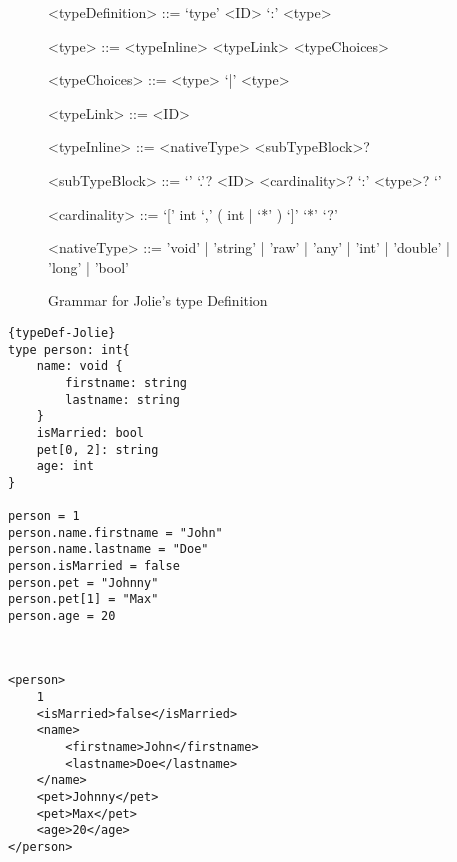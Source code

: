 \begin{figure}
	\begin{framed}
		\begin{grammar}
			<typeDefinition> ::= `type' <ID> `:' <type>

			<type> ::= <typeInline>
			\alt <typeLink>
			\alt <typeChoices>

			<typeChoices> ::= <type> `|' <type>

			<typeLink> ::= <ID>

			<typeInline> ::= <nativeType> <subTypeBlock>?

			<subTypeBlock> ::= `{' `.'? <ID> <cardinality>? `:' <type>? `}'

			<cardinality> ::= `[' int `,' ( int | `*' ) `]'
			\alt `*'
			\alt `?'

			<nativeType> ::= 'void' | 'string' | 'raw' | 'any' | 'int' | 'double' | 'long' | 'bool'
		\end{grammar}
	\end{framed}
	\caption{Grammar for Jolie's type Definition \protect\footnotemark}
	\label{fig:TypeDefinitonSyntax}
\end{figure}


\begin{listing}
	\begin{sublisting}{\linewidth}

		\lstset{language=Jolie,
			style=codeStyle
		}
		\begin{lstlisting}[frame=tlrb]{typeDef-Jolie}
type person: int{
	name: void {
		firstname: string
		lastname: string
	}
	isMarried: bool
	pet[0, 2]: string
	age: int
}

person = 1
person.name.firstname = "John"
person.name.lastname = "Doe"
person.isMarried = false
person.pet = "Johnny"
person.pet[1] = "Max"
person.age = 20
\end{lstlisting}
		\caption{ Construction of type and value in Jolie }
		\label{list:type-value}
	\end{sublisting}\\[2ex]
	\begin{sublisting}{\linewidth}
		\lstset{language=XML,
			showspaces=false
		}
		\begin{lstlisting}[frame=tlrb]
<person>
	1
	<isMarried>false</isMarried>
	<name>
		<firstname>John</firstname>
		<lastname>Doe</lastname>
	</name>
	<pet>Johnny</pet>
	<pet>Max</pet>
	<age>20</age>
</person>
\end{lstlisting}
		\caption{ XML representation of \ref{list:type-value} }
		\label{list:type-value-xml}
	\end{sublisting}
	\caption{ Jolie type construction and its representation }
	\label{list:TypeDefinitonUsage}
\end{listing}

\FloatBarrier